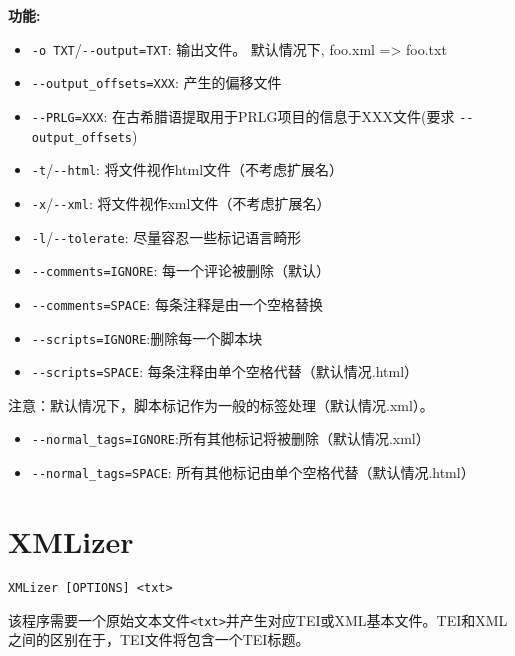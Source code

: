 \bigskip
\noindent \textbf{功能:}
\begin{itemize}
\item \verb+-o TXT+/\verb+--output=TXT+: 输出文件。 默认情况下, foo.xml => foo.txt
\item \verb+--output_offsets=XXX+: 产生的偏移文件
\item \verb+--PRLG=XXX+: 在古希腊语提取用于PRLG项目的信息于XXX文件(要求 \verb+--output_offsets+)
		
\bigskip 
\item \verb+-t+/\verb+--html+: 将文件视作html文件（不考虑扩展名）
\item \verb+-x+/\verb+--xml+: 将文件视作xml文件（不考虑扩展名） 
\item \verb+-l+/\verb+--tolerate+: 尽量容忍一些标记语言畸形
	
\bigskip	 
\item \verb+--comments=IGNORE+: 每一个评论被删除（默认）
\item \verb+--comments=SPACE+: 每条注释是由一个空格替换
		   \item \verb+--scripts=IGNORE+:删除每一个脚本块
		   \item \verb+--scripts=SPACE+: 每条注释由单个空格代替（默认情况.html）
		   
\end{itemize}   
注意：默认情况下，脚本标记作为一般的标签处理（默认情况.xml）。
\begin{itemize}		     
\item \verb+--normal_tags=IGNORE+:所有其他标记将被删除（默认情况.xml）

\item \verb+--normal_tags=SPACE+: 所有其他标记由单个空格代替（默认情况.html）
\end{itemize}




\section{XMLizer}
\label{section-XMLizer}
\verb+XMLizer [OPTIONS] <txt>+

\bigskip
\noindent 该程序需要一个原始文本文件\verb+<txt>+并产生对应TEI或XML基本文件。TEI和XML之间的区别在于，TEI文件将包含一个TEI标题。

